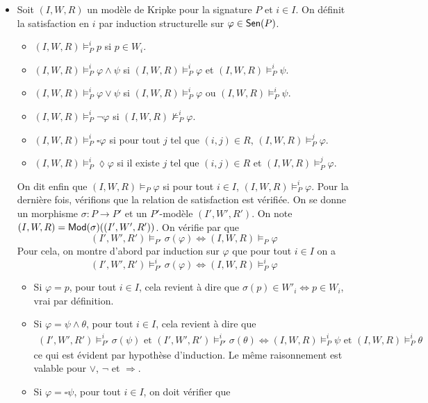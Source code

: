 \documentclass[11pt,a4paper]{article}
\newcommand{\ph}{\varphi}
\newcommand{\itemz}{\item[$\triangleright$]}
\renewcommand{\iff}{\Leftrightarrow}
\newcommand{\info}[1]{\text{{\fontfamily{lmss}\selectfont #1}}}
\newcommand{\Mod}{\info{Mod}}
\newcommand{\Sen}{\info{Sen}}
\newcommand{\1}{\mathbbm{1}}
\begin{document}
\begin{itemize}
\itemz Soit $(I,W,R)$ un modèle de Kripke pour la signature $P$ et $i \in I$. On définit la satisfaction en $i$ par induction structurelle sur $\ph \in \Sen(P)$.
\begin{itemize}
\setlength\itemsep{-0.3em}
\item $(I,W,R) \models^i_P p$ si $p \in W_i$.
\item $(I,W,R) \models^i_P \ph \wedge \psi$ si $(I,W,R) \models^i_P \ph$ et $(I,W,R) \models^i_P \psi$.
\item $(I,W,R) \models^i_P \ph \vee \psi$ si $(I,W,R) \models^i_P \ph$ ou $(I,W,R) \models^i_P \psi$.
\item $(I,W,R) \models^i_P \neg \ph$ si $(I,W,R) \not\models^i_P \ph$.
\item $(I,W,R) \models^i_P \square \ph$ si pour tout $j$ tel que $(i,j) \in R$, $(I,W,R) \models^j_P \ph$.
\item $(I,W,R) \models^i_P \lozenge \ph$ si il existe $j$ tel que $(i,j) \in R$ et $(I,W,R) \models^j_P \ph$.
\end{itemize}
On dit enfin que $(I,W,R) \models_P \ph$ si pour tout $i \in I$, $(I,W,R) \models^i_P \ph$. Pour la dernière fois, vérifions que la relation de satisfaction est vérifiée. On se donne un morphisme $\sigma : P \to P'$ et un $P'$-modèle $(I',W',R')$. On note $(I,W,R) = \Mod(\sigma)((I',W',R'))$. On vérifie par que 
\[ (I',W',R') \models_{P'} \sigma(\ph) \iff (I,W,R) \models_P \ph \]
Pour cela, on montre d'abord par induction sur $\ph$ que pour tout $i \in I$ on a 
\begin{equation} (I',W',R') \models^i_{P'} \sigma(\ph) \iff (I,W,R) \models^i_P \ph \label{mplsat} \end{equation} 
\begin{itemize}
\setlength\itemsep{-0.3em}
\item Si $\ph = p$, pour tout $i \in I$, cela revient à dire que $\sigma(p) \in W'_i \iff p \in W_i$, vrai par définition.
\item Si $\ph = \psi \wedge \theta$, pour tout $i \in I$, cela revient à dire que 
\begin{align*} (I',W',R') \models^i_{P'} \sigma(\psi) \text{ et } (I',W',R') \models^i_{P'} \sigma(\theta) \iff (I,W,R) \models^i_P \psi \text{ et } (I,W,R) \models^i_P \theta
\end{align*}
ce qui est évident par hypothèse d'induction. Le même raisonnement est valable pour $\vee$, $\neg$ et $\Rightarrow$.
\item Si $\ph = \square \psi$, pour tout $i \in I$, on doit vérifier que

\end{itemize}
\end{itemize}
\end{document}
